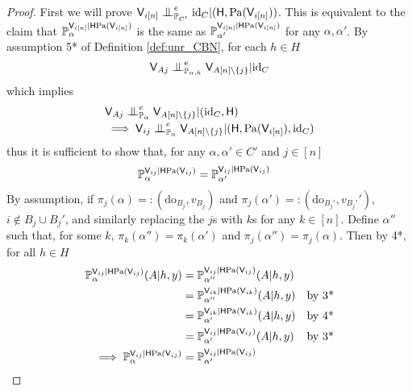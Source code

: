 \begin{proof}
First we will prove $\RV{V}_{i[n]}\CI^e_{\prob{P}_{C'}}\text{id}_C|(\RV{H},\mathrm{Pa}(\RV{V}_{i [n]}))$. This is equivalent to the claim that $\mathbb{P}_\alpha^{\mathsf{V}_{i[n]}|\mathsf{H}\mathrm{Pa}(\mathsf{V}_{i[n]})}$ is the same as $\mathbb{P}_{\alpha'}^{\mathsf{V}_{i[n]}|\mathsf{H}\mathrm{Pa}(\mathsf{V}_{i[n]})}$ for any $\alpha,\alpha'$. By assumption 5* of Definition \ref{def:unr_CBN}, for each $h\in H$
\begin{align}
    \RV{V}_{Aj}\CI^e_{\prob{P}_{\alpha,h}} \RV{V}_{A [n]\setminus\{j\}} |\text{id}_C
\end{align}
which implies
\begin{align}
    &\RV{V}_{Aj}\CI^e_{\prob{P}_{\alpha}} \RV{V}_{A [n]\setminus\{j\}} |(\text{id}_C,\RV{H})\\
    &\implies \RV{V}_{ij}\CI^e_{\prob{P}_{\alpha}} \RV{V}_{A [n]\setminus\{j\}} |(\RV{H},\mathrm{Pa}(\RV{V}_{i[n]}),\text{id}_C)\label{eqApp:mutual_conditional_independence}
\end{align}
thus it is sufficient to show that, for any $\alpha,\alpha'\in C'$ and $j\in[n]$
\begin{align}
    \mathbb{P}_\alpha^{\mathsf{V}_{ij}|\mathsf{H}\mathrm{Pa}(\mathsf{V}_{ij})} &= \mathbb{P}_{\alpha'}^{\mathsf{V}_{ij}|\mathsf{H}\mathrm{Pa}(\mathsf{V}_{ij})}
\end{align}
By assumption, if $\pi_j(\alpha) =: (\mathrm{do}_{B_j},v_{B_j})$ and $\pi_j(\alpha') =: (\mathrm{do}_{B_j'},v_{B_j'}')$, $i\not\in B_j\cup B_j'$, and similarly replacing the $j$s with $k$s for any $k\in [n]$. Define $\alpha''$ such that, for some $k$, $\pi_k(\alpha'')=\pi_k(\alpha')$ and $\pi_j(\alpha'')=\pi_j(\alpha)$. Then by 4*, for all $h\in H$
\begin{align}
    \mathbb{P}_{\alpha}^{\mathsf{V}_{ij}|\mathsf{H}\mathrm{Pa}(\mathsf{V}_{ij})}(A|h,y) &= \mathbb{P}_{\alpha''}^{\mathsf{V}_{ij}|\mathsf{H}\mathrm{Pa}(\mathsf{V}_{ij})}(A|h,y)\\
    &= \mathbb{P}_{\alpha''}^{\mathsf{V}_{ik}|\mathsf{H}\mathrm{Pa}(\mathsf{V}_{ik})}(A|h,y)&\text{by 3*}\\
    &= \mathbb{P}_{\alpha'}^{\mathsf{V}_{ik}|\mathsf{H}\mathrm{Pa}(\mathsf{V}_{ik})}(A|h,y)&\text{by 4*}\\
    &= \mathbb{P}_{\alpha'}^{\mathsf{V}_{ij}|\mathsf{H}\mathrm{Pa}(\mathsf{V}_{ij})}(A|h,y)&\text{by 3*}\\
    \implies \mathbb{P}_\alpha^{\mathsf{V}_{ij}|\mathsf{H}\mathrm{Pa}(\mathsf{V}_{ij})} &= \mathbb{P}_{\alpha'}^{\mathsf{V}_{ij}|\mathsf{H}\mathrm{Pa}(\mathsf{V}_{ij})}
\end{align}


\end{proof}
